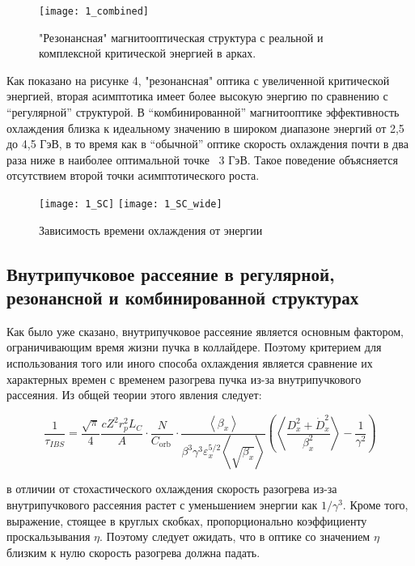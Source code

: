 \begin{figure}[!h]
  \centering
   \texttt{[image: 1\_combined]}
   \caption{"Резонансная" магнитооптическая структура с реальной и комплексной критической энергией в арках.}
   \label{fig:1_combined}
\end{figure}

\noindent Как показано на рисунке 4, "резонансная" оптика с увеличенной критической энергией, вторая асимптотика имеет более высокую энергию по сравнению с “регулярной” структурой. В “комбинированной” магнитооптике эффективность охлаждения близка к идеальному значению в широком диапазоне энергий от 2,5 до 4,5 ГэВ, в то время как в “обычной” оптике скорость охлаждения почти в два раза ниже в наиболее оптимальной точке ~3 ГэВ. Такое поведение объясняется отсутствием второй точки асимптотического роста.

\begin{figure}[!h]
  \centering
   \texttt{[image: 1\_SC]}
   \texttt{[image: 1\_SC\_wide]}
   \caption{Зависимость времени охлаждения от энергии}
   \label{fig:1_SC}
\end{figure}

\subsection{Внутрипучковое рассеяние в регулярной, резонансной и комбинированной структурах}\label{sec:ions_light/IBS_res_reg}

\par  Как было уже сказано, внутрипучковое рассеяние является основным фактором, ограничивающим время жизни пучка в коллайдере. Поэтому критерием для использования того или иного способа охлаждения является сравнение их характерных времен с временем разогрева пучка из-за внутрипучкового рассеяния. Из общей теории этого явления следует:

\begin{equation}
\frac{1}{\tau_{IBS}}=\frac{\sqrt\pi}{4}\frac{cZ^2r_p^2L_C}{A}\cdot\frac{N}{C_{\mathrm{orb\ }}}\cdot\frac{\left\langle\beta_x\right\rangle}{\beta^3\gamma^3\varepsilon_x^{5/2}\left\langle\sqrt{\beta_x}\right\rangle}\left(\left\langle\frac{D_x^2+{\dot{D}}_x^2}{\beta_x^2}\right\rangle-\frac{1}{\gamma^2}\right)
\end{equation}

\noindent в отличии от стохастического охлаждения скорость разогрева из-за внутрипучкового рассеяния растет с уменьшением энергии как $1/\gamma^3$. Кроме того, выражение, стоящее в круглых скобках, пропорционально коэффициенту проскальзывания $\eta$. Поэтому следует ожидать, что в оптике со значением $\eta$ близким к нулю скорость разогрева должна падать. 

